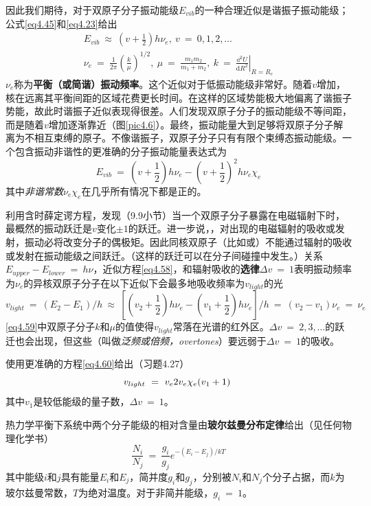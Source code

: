 \documentclass[12pt,a4paper,openany]{ctexbook}
\newcommand{\dd}[1]{\mathrm{d} #1}
\begin{document}
\begin{flushleft}
因此我们期待，对于双原子分子振动能级$E_{vib}$的一种合理近似是谐振子振动能级；公式\eqref{eq4.45}和\eqref{eq4.23}给出
\begin{gather}
    \boxed{E_{vib}\ \approx\ (v+\frac{1}{2})h\nu_e,\ v\ =\ 0,1,2,\dots} \label{eq4.58} \\
    \boxed{\nu_e\ =\ \frac{1}{2\pi}(\frac{k}{\mu})^{1/2},\ \mu\ =\ \frac{m_1m_2}{m_1+m_2},\ k\ =\ \left.\frac{\dd^2U}{\dd R^2}\right|_{R=R_e}} \label{eq4.59}
\end{gather}
$\nu_e$称为\textbf{平衡（或简谐）振动频率}。这个近似对于低振动能级非常好。随着$v$增加，核在远离其平衡间距的区域花费更长时间。在这样的区域势能极大地偏离了谐振子势能，故此时谐振子近似表现得很差。人们发现双原子分子的振动能级不等间距，而是随着$v$增加逐渐靠近（图\ref{pic4.6}）。最终，振动能量大到足够将双原子分子解离为不相互束缚的原子。不像谐振子，双原子分子只有有限个束缚态振动能级。一个包含振动非谐性的更准确的分子振动能量表达式为
\begin{equation}
    E_{vib}\ =\ (v+\frac{1}{2})h\nu_e-(v+\frac{1}{2})^2h\nu_e\chi_e \label{eq4.60}
\end{equation}
其中\textit{非谐常数}$\nu_e\chi_e$在几乎所有情况下都是正的。

利用含时薛定谔方程，发现（9.9小节）当一个双原子分子暴露在电磁辐射下时，最概然的振动跃迁是$v$变化$\pm1$的跃迁。进一步说，，对出现的电磁辐射的吸收或发射，振动必将改变分子的偶极矩。因此同核双原子（比如或）不能通过辐射的吸收或发射在振动能级之间跃迁。（这样的跃迁可以在分子间碰撞中发生。）关系$E_{upper}-E_{lower}\ =\ h\nu$，近似方程\eqref{eq4.58}，和辐射吸收的\textbf{选律}$\Delta v\ =\ 1$表明振动频率为$\nu_e$的异核双原子分子在以下近似下会最多地吸收频率为$v_{light}$的光
\begin{equation}
    v_{light}\ =\ (E_2-E_1)/h\ \approx\ [(v_2+\frac{1}{2})h\nu_e-(v_1+\frac{1}{2})h\nu_e]/h\ =\ (v_2-v_1)\nu_e\ =\ \nu_e \label{eq4.61}
\end{equation}
\eqref{eq4.59}中双原子分子$k$和$\mu$的值使得$v_{light}$常落在光谱的红外区。$\Delta v\ =\ 2,3,\dots$的跃迁也会出现，但这些（叫做\textit{泛频或倍频，overtones}）要远弱于$\Delta v\ =\ 1$的吸收。

使用更准确的方程\eqref{eq4.60}给出（习题4.27）
\begin{equation}
    v_{light}\ =\ v_e\-2v_e\chi_e(v_1+1)\ \label{eq4.62}
\end{equation}
其中$v_1$是较低能级的量子数，$\Delta v\ =\ 1$。

热力学平衡下系统中两个分子能级的相对含量由\textbf{玻尔兹曼分布定律}给出（见任何物理化学书）
\begin{equation}
    \boxed{\frac{N_i}{N_j}\ =\ \frac{g_i}{g_j}e^{-(E_i-E_j)/kT}} \label{eq4.63}
\end{equation}
其中能级$i$和$j$具有能量$E_i$和$E_j$，简并度$g_i$和$g_j$，分别被$N_i$和$N_j$个分子占据，而$k$为玻尔兹曼常数，$T$为绝对温度。对于非简并能级，$g_i\ =\ 1$。


\end{flushleft}
\end{document}
